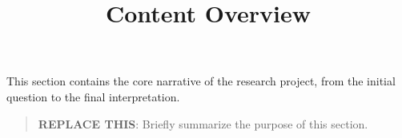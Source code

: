 \documentclass[
]{report}
\title{Content Overview}
\author{}
\date{}
\renewcommand*\contentsname{Table of contents}
\newcommand\contentsname{Table of contents}
\begin{document}
\maketitle

\renewcommand*\contentsname{Table of contents}
{
\hypersetup{linkcolor=}
\setcounter{tocdepth}{2}
\tableofcontents
}

This section contains the core narrative of the research project, from
the initial question to the final interpretation.

\begin{quote}
\textbf{REPLACE THIS}: Briefly summarize the purpose of this section.
\end{quote}
\end{document}
